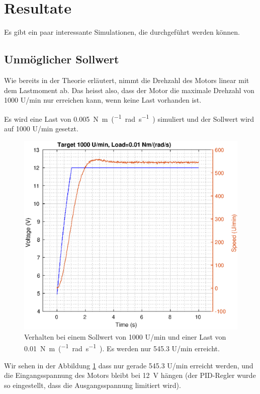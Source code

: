 \section{Resultate}

Es  gibt  ein  paar  interessante  Simulationen,  die  durchgef\"uhrt   werden
k\"onnen.

\subsection{Unm\"oglicher Sollwert}

Wie bereits in der Theorie erl\"autert, nimmt die  Drehzahl  des Motors linear
mit dem Lastmoment ab. Das heisst also, dass der Motor  die  maximale Drehzahl
von 1000 U/min nur erreichen kann, wenn keine Last vorhanden ist.

Es   wird   eine  Last  von  \SI{0.005}{\newton\meter\per(\radian\per\second)}
simuliert und der Sollwert wird auf 1000 U/min gesetzt.

\begin{figure}[H]
    \centering
    \includegraphics[width=\imagewidth]{images/target_1000_load_10}
    \caption{Verhalten bei einem Sollwert von 1000 U/min und einer Last von \SI{0.01}{\newton\meter\per(\radian\per\second)}. Es werden nur 545.3 U/min erreicht.}
    \label{fig:target_1000_load_10}
\end{figure}

Wir sehen in der Abbildung \ref{fig:target_1000_load_10} dass nur gerade 545.3
U/min  erreicht  werden,  und  die  Eingangsspannung  des  Motors  bleibt  bei
\SI{12}{\volt}  h\"angen  (der  PID-Regler  wurde  so  eingestellt,  dass  die
Ausgangsspannung limitiert wird).


